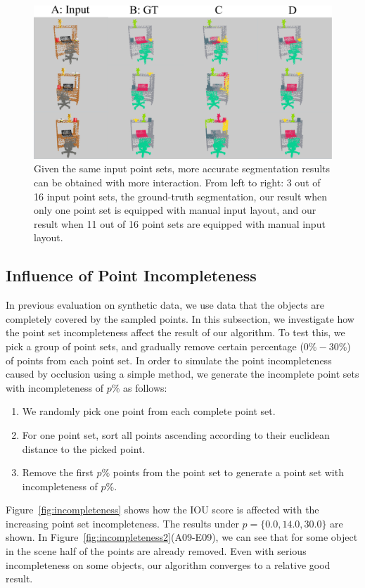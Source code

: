 \begin{figure}
	\centering
	\includegraphics[width=\linewidth]{images/interact/interact}
	\caption{Given the same input point sets, more accurate segmentation results can be obtained with more interaction. From left to right: 3 out of 16 input point sets, the ground-truth segmentation, our result when only one point set is equipped with manual input layout, and our result when 11 out of 16 point sets are equipped with manual input layout.
	}
	\label{fig:interact_vis}
\end{figure}

\subsection{Influence of Point Incompleteness}
\label{sec:exp-incompleteness}
In previous evaluation on synthetic data, we use data that the objects are completely covered by the sampled points. 
%
In this subsection, we investigate how the point set incompleteness affect the result of our algorithm. 
%
To test this, we pick a group of point sets, and gradually remove certain percentage ($0\%-30\%$) of points from each point set. In order to simulate the point incompleteness caused by occlusion using a simple method, we generate the incomplete point sets with incompleteness of $p\%$ as follows:
\begin{enumerate}
	\item We randomly pick one point from each complete point set. 
	\item For one point set, sort all points ascending according to their euclidean distance to the picked point.  
	\item Remove the first $p\%$ points from the point set to generate a point set with incompleteness of $p\%$.
\end{enumerate}
% 
Figure~\ref{fig:incompleteness} shows how the IOU score is affected with the increasing point set incompleteness. 
The results under $p=\{0.0,14.0,30.0\}$ are shown. In Figure~\ref{fig:incompleteness2}(A09-E09), we can see that for some object in the scene half of the points are already removed. Even with serious incompleteness on some objects, our algorithm converges to a relative good result.

